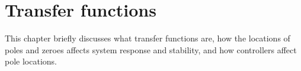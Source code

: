 
\chapter{Transfer functions}

This chapter briefly discusses what transfer functions are, how the locations of
poles and zeroes affects \gls{system response} and stability, and how
controllers affect pole locations.

\renewcommand*{\chapterpath}{\partpath/transfer-functions}







